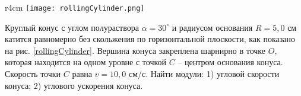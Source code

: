 \begin{wrapfigure}[10]{r}{4cm}
\texttt{[image: rollingCylinder.png]}
\caption{}
\label{rollingCylinder}
\end{wrapfigure}
\AddProb Круглый конус с углом полураствора $\alpha = 30^{\circ}$ и радиусом основания $R = 5,0$ см катится равномерно без скольжения по горизонтальной плоскости, как показано на рис. \ref{rollingCylinder}. Вершина конуса закреплена шарнирно в точке $O$, которая находится на одном уровне с точкой $C$ -- центром основания конуса. Скорость точки $C$ равна $v = 10,0$ см/с. Найти модули: 1) угловой скорости конуса; 2) углового ускорения конуса.

\clearpage